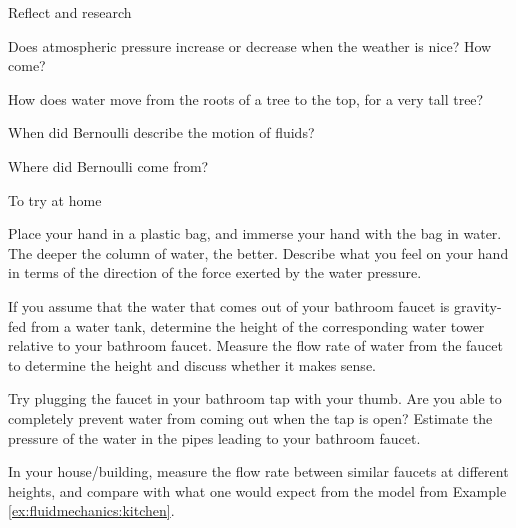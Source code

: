 {{\begin{chapteractivity}{Reflect and research}
{
\item Does atmospheric pressure increase or decrease when the weather is nice? How come?
\item How does water move from the roots of a tree to the top, for a very tall tree?
\item When did Bernoulli describe the motion of fluids?
\item Where did Bernoulli come from?
}
\end{chapteractivity}
\begin{chapteractivity}{To try at home}
{
\item Place your hand in a plastic bag, and immerse your hand with the bag in water. The deeper the column of water, the better. Describe what you feel on your hand in terms of the direction of the force exerted by the water pressure.
\item If you assume that the water that comes out of your bathroom faucet is gravity-fed from a water tank, determine the height of the corresponding water tower relative to your bathroom faucet. Measure the flow rate of water from the faucet to determine the height and discuss whether it makes sense. 
\item Try plugging the faucet in your bathroom tap with your thumb. Are you able to completely prevent water from coming out when the tap is open? Estimate the pressure of the water in the pipes leading to your bathroom faucet.
\item In your house/building, measure the flow rate between similar faucets at different heights, and compare with what one would expect from the model from Example \ref{ex:fluidmechanics:kitchen}.
}
\end{chapteractivity}

}}
